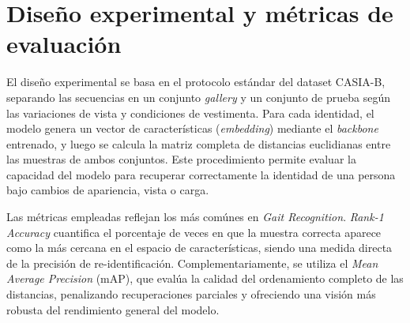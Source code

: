 \section{Diseño experimental y métricas de evaluación}

El diseño experimental se basa en el protocolo estándar del dataset CASIA-B, separando las secuencias en un conjunto \textit{gallery} y un conjunto de prueba según las variaciones de vista y condiciones de vestimenta. Para cada identidad, el modelo genera un vector de características (\textit{embedding}) mediante el \textit{backbone} entrenado, y luego se calcula la matriz completa de distancias euclidianas entre las muestras de ambos conjuntos. Este procedimiento permite evaluar la capacidad del modelo para recuperar correctamente la identidad de una persona bajo cambios de apariencia, vista o carga.

Las métricas empleadas reflejan los más comúnes en \textit{Gait Recognition}. \textit{Rank-1 Accuracy} cuantifica el porcentaje de veces en que la muestra correcta aparece como la más cercana en el espacio de características, siendo una medida directa de la precisión de re-identificación. Complementariamente, se utiliza el \textit{Mean Average Precision} (mAP), que evalúa la calidad del ordenamiento completo de las distancias, penalizando recuperaciones parciales y ofreciendo una visión más robusta del rendimiento general del modelo.

